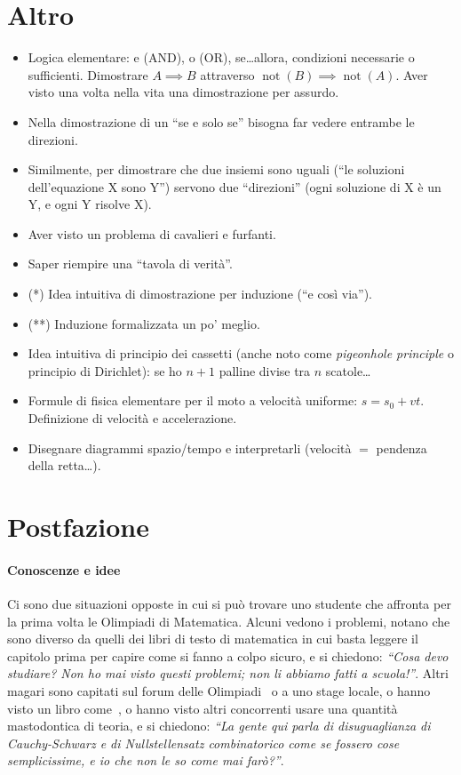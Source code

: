 \documentclass[a4paper,10pt]{paper}
\renewcommand{\star}{(*)}
\newcommand{\sstar}{(**)}
\begin{document}
\section{Altro}
\begin{itemize}
 \item Logica elementare: e (AND), o (OR), se\dots{}allora, condizioni necessarie o sufficienti. Dimostrare $A \implies B$ attraverso $\operatorname{not}(B)\implies \operatorname{not}(A)$. Aver visto una volta nella vita una dimostrazione per assurdo.
 \item Nella dimostrazione di un ``se e solo se'' bisogna far vedere entrambe le direzioni.
 \item Similmente, per dimostrare che due insiemi sono uguali (``le soluzioni dell'equazione X sono Y'') servono due ``direzioni'' (ogni soluzione di X è un Y, e ogni Y risolve X).
 \item Aver visto un problema di cavalieri e furfanti.
 \item Saper riempire una ``tavola di verità''.
 \item \star{} Idea intuitiva di dimostrazione per induzione (``e così via'').
 \item \sstar{} Induzione formalizzata un po' meglio.
 \item Idea intuitiva di principio dei cassetti (anche noto come \emph{pigeonhole principle} o principio di Dirichlet): se ho $n+1$ palline divise tra $n$ scatole\dots
 \item Formule di fisica elementare per il moto a velocità uniforme: $s=s_0+vt$. Definizione di velocità e accelerazione.
 \item Disegnare diagrammi spazio/tempo e interpretarli (velocità $=$ pendenza della retta\dots).
\end{itemize}

\section*{Postfazione}
 
\paragraph{Conoscenze e idee} Ci sono due situazioni opposte in cui si può trovare uno studente che affronta per la prima volta le Olimpiadi di Matematica. Alcuni vedono i problemi, notano che sono diverso da quelli dei libri di testo di matematica in cui basta leggere il capitolo prima per capire come si fanno a colpo sicuro, e si chiedono: \emph{``Cosa devo studiare? Non ho mai visto questi problemi; non li abbiamo fatti a scuola!''}. Altri magari sono capitati sul forum delle Olimpiadi~\cite{oliforum} o a uno stage locale, o hanno visto un libro come~\cite{schedeolimpiche}, o hanno visto altri concorrenti usare una quantità mastodontica di teoria, e si chiedono: \emph{``La gente qui parla di disuguaglianza di Cauchy-Schwarz e di Nullstellensatz combinatorico come se fossero cose semplicissime, e io che non le so come mai farò?''}.
 
\end{document}
